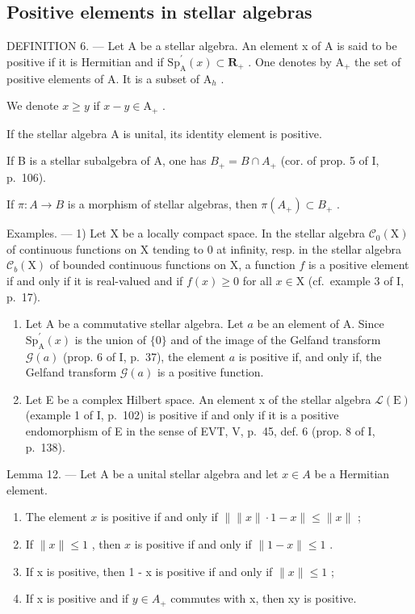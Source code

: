 \subsection{Positive elements in stellar algebras}

DEFINITION 6. --- Let A be a stellar algebra. An element x of A is said to be positive if it is Hermitian and if \(\mathrm{Sp}_{\mathrm{A}}^{\prime}(x) \subset \mathbf{R}_{+}\) . One denotes by \(\mathrm{A}_{+}\) the set of positive elements of A. It is a subset of \(\mathrm{A}_{h}\) .

We denote \(x \geqslant y\) if \(x - y \in \mathrm{A}_{+}\) .

If the stellar algebra A is unital, its identity element is positive.

If B is a stellar subalgebra of A, one has \(B_{+} = B \cap A_{+}\) (cor. of prop. 5 of I, p.~106).

If \(\pi\colon A\to B\) is a morphism of stellar algebras, then \(\pi(A_{+})\subset B_{+}\) .

Examples. --- 1) Let X be a locally compact space. In the stellar algebra \(\mathcal{C}_{0}(\mathrm{X})\) of continuous functions on X tending to 0 at infinity, resp. in the stellar algebra \(\mathcal{C}_{b}(\mathrm{X})\) of bounded continuous functions on X, a function \(f\) is a positive element if and only if it is real-valued and if \(f(x) \geqslant 0\) for all \(x \in \mathrm{X}\) (cf.~example 3 of I, p.~17).

\begin{enumerate}
\def\labelenumi{\arabic{enumi})}
\setcounter{enumi}{1}
\item
  Let A be a commutative stellar algebra. Let \(a\) be an element of A. Since \(\mathrm{Sp}_{\mathrm{A}}^{\prime}(x)\) is the union of \(\{0\}\) and of the image of the Gelfand transform \(\mathcal{G}(a)\) (prop. 6 of I, p.~37), the element \(a\) is positive if, and only if, the Gelfand transform \(\mathcal{G}(a)\) is a positive function.
\item
  Let E be a complex Hilbert space. An element x of the stellar algebra \(\mathcal{L}(\mathrm{E})\) (example 1 of I, p.~102) is positive if and only if it is a positive endomorphism of E in the sense of EVT, V, p.~45, def. 6 (prop. 8 of I, p.~138).
\end{enumerate}

Lemma 12. --- Let A be a unital stellar algebra and let \(x \in A\) be a Hermitian element.

\begin{enumerate}
\def\labelenumi{\alph{enumi})}
\item
  The element \(x\) is positive if and only if \(\left\| \|x\| \cdot 1 - x \right\| \leqslant \|x\|\) ;
\item
  If \(\| x\| \leqslant 1\) , then \(x\) is positive if and only if \(\| 1 - x\| \leqslant 1\) .
\item
  If x is positive, then 1 - x is positive if and only if \(\|x\| \leqslant 1\) ;
\item
  If x is positive and if \(y \in A_{+}\) commutes with x, then xy is positive.
\end{enumerate}

